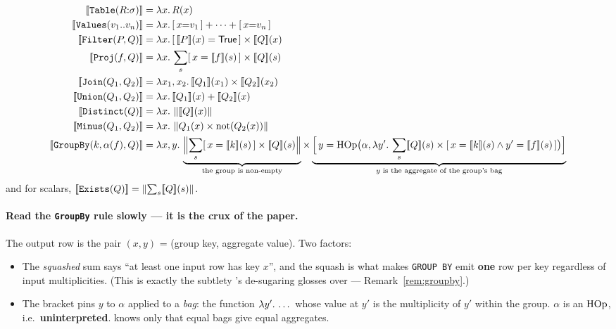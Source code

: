 \begin{align*}
\den{\texttt{Table}(R{:}\sigma)} &= \lam{x}{R(x)}\\
\den{\texttt{Values}(v_1..v_n)} &= \lam{x}{\ind{x{=}v_1}+\cdots+\ind{x{=}v_n}}\\
\den{\texttt{Filter}(P,Q)} &= \lam{x}{\ind{\den{P}(x)=\textsf{True}}\times\den{Q}(x)}\\
\den{\texttt{Proj}(f,Q)} &= \lam{x}{\usum{s}\ind{x=\den{f}(s)}\times\den{Q}(s)}\\
\den{\texttt{Join}(Q_1,Q_2)} &= \lam{x_1,x_2}{\den{Q_1}(x_1)\times\den{Q_2}(x_2)}\\
\den{\texttt{Union}(Q_1,Q_2)} &= \lam{x}{\den{Q_1}(x)+\den{Q_2}(x)}\\
\den{\texttt{Distinct}(Q)} &= \lam{x}{\sq{\den{Q}(x)}}\\
\den{\texttt{Minus}(Q_1,Q_2)} &= \lam{x}{\sq{Q_1(x)\times\notu{Q_2(x)}}}\\
\den{\texttt{GroupBy}(k,\alpha(f),Q)} &= \lam{x,y}{
   \underbrace{\Bigl\lVert\usum{s}\ind{x=\den{k}(s)}\times\den{Q}(s)\Bigr\rVert}_{\text{the group is non-empty}}
   \times \underbrace{\Bigl[\,y=\hop\bigl(\alpha,\lam{y'}{\usum{s}\den{Q}(s)\times\ind{x=\den{k}(s)\wedge y'=\den{f}(s)}}\bigr)\Bigr]}_{\text{$y$ is the aggregate of the group's bag}}}
\end{align*}
and for scalars, $[\![ \texttt{Exists}(Q) ]\!]=\left\lVert \sum_{s}[\![ Q ]\!](s) \right\rVert$.

\paragraph{Read the \texttt{GroupBy} rule slowly --- it is the crux of the paper.}
The output row is the pair $(x,y)$ = (group key, aggregate value). Two factors:
\begin{itemize}
\item The \emph{squashed} sum says ``at least one input row has key $x$'', and the squash is
      what makes \lstinline|GROUP BY| emit \textbf{one} row per key regardless of input
      multiplicities. (This is exactly the subtlety \udp{}'s de-sugaring glosses over ---
      Remark~\ref{rem:groupby}.)
\item The bracket pins $y$ to $\alpha$ applied to a \emph{bag}: the function
      $\lambda y'.\,\dots$ whose value at $y'$ is the multiplicity of $y'$ within the group.
      $\alpha$ is an $\mathrm{HOp}$, i.e.\ \textbf{uninterpreted}. \QED{} knows only that equal bags
      give equal aggregates.
\end{itemize}


